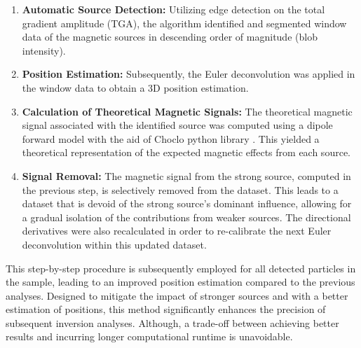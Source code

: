 \begin{enumerate}
  \item \textbf{Automatic Source Detection:} Utilizing edge detection on the total gradient amplitude (TGA), the algorithm identified and segmented window data of the magnetic sources in descending order of magnitude (blob intensity). 

  \item \textbf{Position Estimation:} Subsequently, the Euler deconvolution was applied in the window data to obtain a 3D position estimation.
  
  \item \textbf{Calculation of Theoretical Magnetic Signals:} The theoretical magnetic signal associated with the identified source was computed using a dipole forward model with the aid of Choclo python library \citep{choclo2022}. This yielded a theoretical representation of the expected magnetic effects from each source.
  
  \item \textbf{Signal Removal:} The magnetic signal from the strong source, computed in the previous step, is selectively removed from the dataset. This leads to a dataset that is devoid of the strong source's dominant influence, allowing for a gradual isolation of the contributions from weaker sources. The directional derivatives were also recalculated in order to re-calibrate the next Euler deconvolution within this updated dataset.
    
\end{enumerate}

This step-by-step procedure is subsequently employed for all detected particles in the sample, leading to an improved position estimation compared to the previous analyses. Designed to mitigate the impact of stronger sources and with a better estimation of positions, this method significantly enhances the precision of subsequent inversion analyses. Although, a trade-off between achieving better results and incurring longer computational runtime is unavoidable. 



